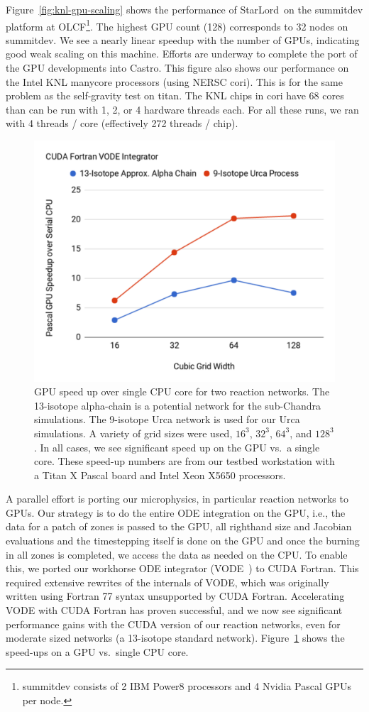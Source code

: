 \documentclass[a4paper]{jpconf}
\newcommand{\castro}{{\sffamily Castro}}
\newcommand{\starlord}{{\sffamily StarLord}}
\newcommand{\MarginPar}[1]{\marginpar{\vskip-\baselineskip\raggedright\tiny\sffamily\hrule\smallskip{\color{red}#1}\par\smallskip\hrule}}
\begin{document}
Figure~\ref{fig:knl-gpu-scaling} shows the performance of
\starlord\ on the summitdev platform at OLCF\footnote{summitdev
  consists of 2 IBM Power8 processors and 4 Nvidia Pascal GPUs per
  node.}.  The highest GPU count (128) corresponds to 32 nodes on
summitdev.  We see a nearly linear speedup with the number of GPUs,
indicating good weak scaling on this machine.  Efforts are underway to
complete the port of the GPU developments into \castro.  This figure
also shows our performance on the Intel KNL manycore processors (using
NERSC cori).  This is for the same problem as the self-gravity test on
titan. \MarginPar{need more info: base grid?}  The KNL chips in cori
have 68 cores than can be run with 1, 2, or 4 hardware threads each.
For all these runs, we ran with 4 threads / core (effectively 272
threads / chip).

\begin{figure}[t]
\centering
\includegraphics[width=0.48\linewidth]{CUDA-Fortran-VODE-Integrator}
\begin{minipage}[b]{0.48\linewidth}
\caption{\label{fig:cudaode} GPU speed up over single CPU core for two
  reaction networks.  The 13-isotope alpha-chain is a
  potential network for the sub-Chandra simulations.
  The 9-isotope Urca network is used for our Urca simulations.  A
  variety of grid sizes were used, $16^3$, $32^3$, $64^3$, and
  $128^3$.  In all cases, we see significant speed up on the GPU
  vs.\ a single core.  These speed-up numbers are from our testbed
  workstation with a Titan X Pascal board and Intel Xeon X5650 processors.}
\end{minipage}
\end{figure}

A parallel effort is porting our microphysics, in particular reaction
networks to GPUs.  Our strategy is to do the entire ODE integration on
the GPU, i.e., the data for a patch of zones is passed to the GPU, all
righthand size and Jacobian evaluations and the timestepping itself is
done on the GPU and once the burning in all zones is completed, we access the data as
needed on the CPU.  To enable this, we ported our workhorse ODE
integrator (VODE~\cite{vode}) to CUDA Fortran. This required extensive
rewrites of the internals of VODE, which was originally written using
Fortran 77 syntax unsupported by CUDA Fortran. Accelerating VODE with
CUDA Fortran has proven successful, and we now see significant
performance gains with the CUDA version of our reaction networks, even
for moderate sized networks (a 13-isotope standard network).
Figure~\ref{fig:cudaode} shows the speed-ups on a GPU vs.\ single CPU
core.
\end{document}
